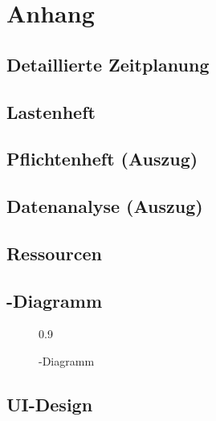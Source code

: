 \section{Anhang}
\subsection{Detaillierte Zeitplanung}
\label{app:Zeitplanung}


\clearpage

\subsection{Lastenheft}
\label{app:Lastenheft}


\clearpage

\subsection{Pflichtenheft (Auszug)}
\label{app:Pflichtenheft}


\clearpage

\subsection{Datenanalyse (Auszug)}
\label{app:Datenanalyse}


\clearpage

\subsection{Ressourcen}
\label{app:Ressourcen}


\clearpage

\subsection{-Diagramm}
\label{app:Use Case Diagramm}

\begin{figure}[htb]
\centering
{} {0.9}
\caption{-Diagramm}
\label{fig:UseCase}
\end{figure}

\clearpage

\subsection{UI-Design}
\label{app:UI-Design}

